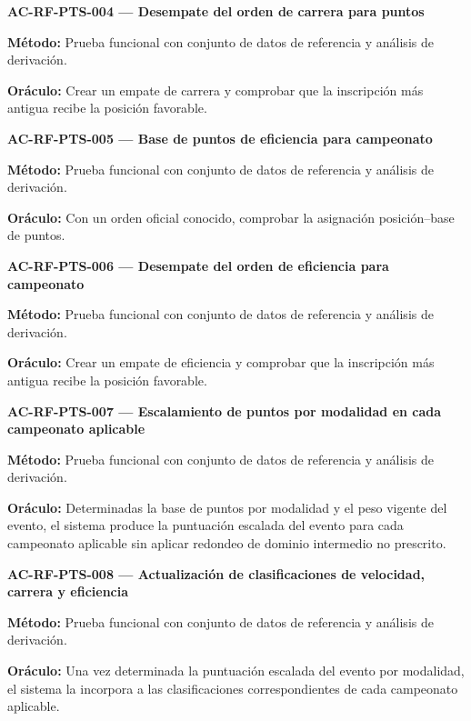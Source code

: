 \documentclass[10pt,letterpaper]{article}
\begin{document}
\noindent\textbf{AC-RF-PTS-004 --- Desempate del orden de carrera para puntos}\par
\textbf{Método:} Prueba funcional con conjunto de datos de referencia y análisis de derivación.\par
\textbf{Oráculo:} Crear un empate de carrera y comprobar que la inscripción más antigua recibe la posición favorable.\par\vspace{0.45em}
\noindent\textbf{AC-RF-PTS-005 --- Base de puntos de eficiencia para campeonato}\par
\textbf{Método:} Prueba funcional con conjunto de datos de referencia y análisis de derivación.\par
\textbf{Oráculo:} Con un orden oficial conocido, comprobar la asignación posición--base de puntos.\par\vspace{0.45em}
\noindent\textbf{AC-RF-PTS-006 --- Desempate del orden de eficiencia para campeonato}\par
\textbf{Método:} Prueba funcional con conjunto de datos de referencia y análisis de derivación.\par
\textbf{Oráculo:} Crear un empate de eficiencia y comprobar que la inscripción más antigua recibe la posición favorable.\par\vspace{0.45em}
\noindent\textbf{AC-RF-PTS-007 --- Escalamiento de puntos por modalidad en cada campeonato aplicable}\par
\textbf{Método:} Prueba funcional con conjunto de datos de referencia y análisis de derivación.\par
\textbf{Oráculo:} Determinadas la base de puntos por modalidad y el peso vigente del evento, el sistema produce la puntuación escalada del evento para cada campeonato aplicable sin aplicar redondeo de dominio intermedio no prescrito.\par\vspace{0.45em}
\noindent\textbf{AC-RF-PTS-008 --- Actualización de clasificaciones de velocidad, carrera y eficiencia}\par
\textbf{Método:} Prueba funcional con conjunto de datos de referencia y análisis de derivación.\par
\textbf{Oráculo:} Una vez determinada la puntuación escalada del evento por modalidad, el sistema la incorpora a las clasificaciones correspondientes de cada campeonato aplicable.\par\vspace{0.45em}
\end{document}
